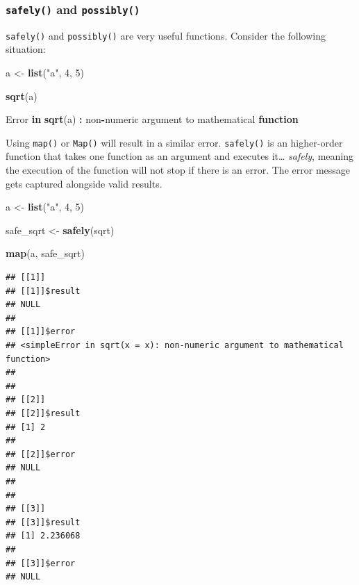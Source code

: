 \documentclass[]{gitbook}
\newenvironment{Shaded}{\begin{snugshade}}{\end{snugshade}}
\newcommand{\ControlFlowTok}[1]{\textcolor[rgb]{0.13,0.29,0.53}{\textbf{#1}}}
\newcommand{\DecValTok}[1]{\textcolor[rgb]{0.00,0.00,0.81}{#1}}
\newcommand{\KeywordTok}[1]{\textcolor[rgb]{0.13,0.29,0.53}{\textbf{#1}}}
\newcommand{\NormalTok}[1]{#1}
\newcommand{\OperatorTok}[1]{\textcolor[rgb]{0.81,0.36,0.00}{\textbf{#1}}}
\newcommand{\StringTok}[1]{\textcolor[rgb]{0.31,0.60,0.02}{#1}}
\theoremstyle{definition}
\theoremstyle{definition}
\theoremstyle{definition}
\theoremstyle{remark}
\begin{document}
\hypertarget{safely-and-possibly}{%
\subsubsection{\texorpdfstring{\texttt{safely()} and
\texttt{possibly()}}{safely() and possibly()}}\label{safely-and-possibly}}

\texttt{safely()} and \texttt{possibly()} are very useful functions.
Consider the following situation:

\begin{Shaded}
\begin{Highlighting}[]
\NormalTok{a <-}\StringTok{ }\KeywordTok{list}\NormalTok{(}\StringTok{"a"}\NormalTok{, }\DecValTok{4}\NormalTok{, }\DecValTok{5}\NormalTok{)}

\KeywordTok{sqrt}\NormalTok{(a)}
\end{Highlighting}
\end{Shaded}

\begin{Shaded}
\begin{Highlighting}[]
\NormalTok{Error }\ControlFlowTok{in} \KeywordTok{sqrt}\NormalTok{(a) }\OperatorTok{:}\StringTok{ }\NormalTok{non}\OperatorTok{-}\NormalTok{numeric argument to mathematical }\ControlFlowTok{function}
\end{Highlighting}
\end{Shaded}

Using \texttt{map()} or \texttt{Map()} will result in a similar error.
\texttt{safely()} is an higher-order function that takes one function as
an argument and executes it\ldots{} \emph{safely}, meaning the execution
of the function will not stop if there is an error. The error message
gets captured alongside valid results.

\begin{Shaded}
\begin{Highlighting}[]
\NormalTok{a <-}\StringTok{ }\KeywordTok{list}\NormalTok{(}\StringTok{"a"}\NormalTok{, }\DecValTok{4}\NormalTok{, }\DecValTok{5}\NormalTok{)}

\NormalTok{safe_sqrt <-}\StringTok{ }\KeywordTok{safely}\NormalTok{(sqrt)}

\KeywordTok{map}\NormalTok{(a, safe_sqrt)}
\end{Highlighting}
\end{Shaded}

\begin{verbatim}
## [[1]]
## [[1]]$result
## NULL
## 
## [[1]]$error
## <simpleError in sqrt(x = x): non-numeric argument to mathematical function>
## 
## 
## [[2]]
## [[2]]$result
## [1] 2
## 
## [[2]]$error
## NULL
## 
## 
## [[3]]
## [[3]]$result
## [1] 2.236068
## 
## [[3]]$error
## NULL
\end{verbatim}
\end{document}
